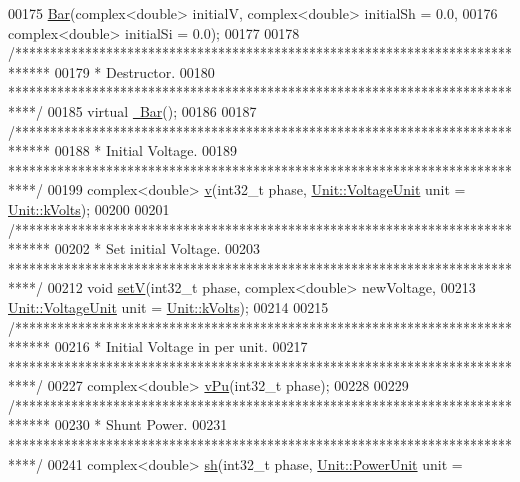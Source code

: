 \begin{DoxyCode}
00175   \hyperlink{group___models_ga9cae2188fcc6cce41caa7898c64548d1}{Bar}(complex<double> initialV, complex<double> initialSh = 0.0,
00176       complex<double> initialSi = 0.0);
00177 
00178   \textcolor{comment}{/*****************************************************************************}
00179 \textcolor{comment}{   * Destructor.}
00180 \textcolor{comment}{   ****************************************************************************/}
00185   \textcolor{keyword}{virtual} \hyperlink{group___models_ga9c7ebea0c189423591741ac438985316}{~Bar}();
00186 
00187   \textcolor{comment}{/*****************************************************************************}
00188 \textcolor{comment}{   * Initial Voltage.}
00189 \textcolor{comment}{   ****************************************************************************/}
00199   complex<double> \hyperlink{group___models_ga1e6f2daec86407118656d88170d1adc2}{v}(int32\_t phase, \hyperlink{class_unit_a55b07dfa9457e1eca2c7194fe0cfc3c1}{Unit::VoltageUnit} unit = 
      \hyperlink{class_unit_a55b07dfa9457e1eca2c7194fe0cfc3c1aa54b2473993a702a3923525765bd6e4c}{Unit::kVolts});
00200 
00201   \textcolor{comment}{/*****************************************************************************}
00202 \textcolor{comment}{   * Set initial Voltage.}
00203 \textcolor{comment}{   ****************************************************************************/}
00212   \textcolor{keywordtype}{void} \hyperlink{group___models_ga9b6fbc92674bfcdc9d5090795ab335a6}{setV}(int32\_t phase, complex<double> newVoltage,
00213             \hyperlink{class_unit_a55b07dfa9457e1eca2c7194fe0cfc3c1}{Unit::VoltageUnit} unit = \hyperlink{class_unit_a55b07dfa9457e1eca2c7194fe0cfc3c1aa54b2473993a702a3923525765bd6e4c}{Unit::kVolts});
00214 
00215   \textcolor{comment}{/*****************************************************************************}
00216 \textcolor{comment}{   * Initial Voltage in per unit.}
00217 \textcolor{comment}{   ****************************************************************************/}
00227   complex<double> \hyperlink{group___models_ga1c54bd76b2f620d970ddfed8cdae4116}{vPu}(int32\_t phase);
00228 
00229   \textcolor{comment}{/*****************************************************************************}
00230 \textcolor{comment}{   * Shunt Power.}
00231 \textcolor{comment}{   ****************************************************************************/}
00241   complex<double> \hyperlink{group___models_gac188071bf5f165b0acdaa4c8af82355c}{sh}(int32\_t phase, \hyperlink{class_unit_ace265ae255370ccacfd5370337572c3b}{Unit::PowerUnit} unit = 

\end{DoxyCode}
